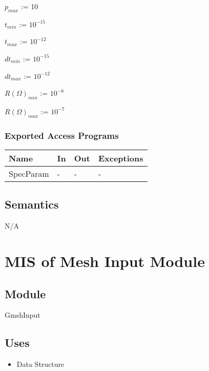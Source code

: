 \documentclass[12pt, titlepage]{article}
\begin{document}
$p_{max}$ := 10

$t_{min}$ := $10^{-15}$
		
$t_{max}$ := $10^{-12}$

$dt_{min}$ := $10^{-15}$

$dt_{max}$ := $10^{-12}$		

$R(\Omega)_{min}$ := $10^{-8}$

$R(\Omega)_{max}$ := $10^{-7}$


\subsubsection{Exported Access Programs}

\begin{center}
	\begin{tabular}{p{2cm} p{4cm} p{4cm} p{2cm}}
		\hline
		\textbf{Name} & \textbf{In} & \textbf{Out} & \textbf{Exceptions} \\
		\hline
		SpecParam & - & - & - \\
		\hline
	\end{tabular}
\end{center}

\subsection{Semantics}
N/A

\newpage
%
%
%
%

\section{MIS of Mesh Input Module} \label{MIM} 



\subsection{Module}
GmshInput

\subsection{Uses}
\begin{itemize}
	\item Data Structure
	
\end{itemize}
\end{document}
